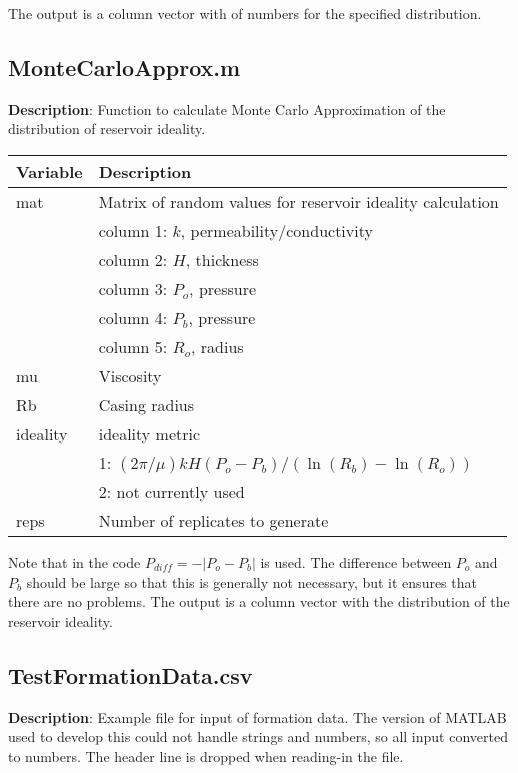 \documentclass[12pt,a4paper]{article}
\begin{document}
The output is a column vector with of numbers for the specified distribution.

\subsection*{\textsf{MonteCarloApprox.m}}

\textbf{Description}: Function to calculate Monte Carlo Approximation of the distribution of reservoir ideality.

\begin{table}[H]
\begin{tabular} {p{2cm} p{11cm}}
\hline
\textbf{Variable} & \textbf{Description}\\
\hline
\textsf{mat} 			 & Matrix of random values for reservoir ideality calculation\\
 & column 1: $k$, permeability/conductivity\\
 & column 2: $H$, thickness\\
 & column 3: $P_o$, pressure\\
 & column 4: $P_b$, pressure\\
 & column 5: $R_o$, radius\\
\textsf{mu} & Viscosity\\
\textsf{Rb} & Casing radius\\
\textsf{ideality} & ideality metric\\
 & 1: $(2\pi/\mu)kH(P_o - P_b)/(\ln(R_b) - \ln(R_o))$\\
 & 2: not currently used\\
\textsf{reps} & Number of replicates to generate\\
\hline
\end{tabular} 
\end{table}

Note that in the code $P_{diff} = -|P_o - P_b|$ is used. The difference between $P_o$ and $P_b$ should be large so that this is generally not necessary, but it ensures that there are no problems. The output is a column vector with the distribution of the reservoir ideality.

\subsection*{\textsf{TestFormationData.csv}}

\textbf{Description}: Example file for input of formation data. The version of MATLAB used to develop this could not handle strings and numbers, so all input converted to numbers. The header line is dropped when reading-in the file.
\end{document}
